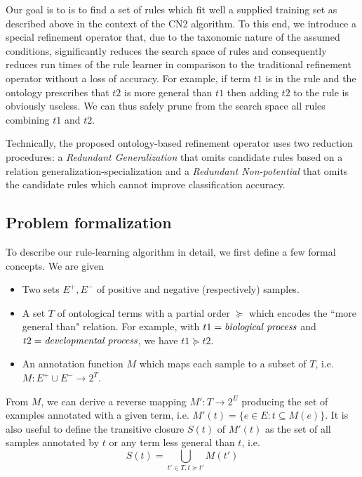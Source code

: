 \documentclass{bmcart}
\begin{document}
Our goal is to is to find a set of rules which fit well a supplied training set as described above in the context of the CN2 algorithm. To this end, we introduce a special refinement operator that, due to the taxonomic nature of the assumed conditions, significantly reduces the search space of rules and consequently reduces run times of the rule learner in comparison to the traditional refinement operator without a loss of accuracy. For example, if term $t1$ is in the rule and the ontology prescribes that $t2$ is more general than $t1$ then adding $t2$ to the rule is obviously useless. We can thus safely prune from the search space all rules combining $t1$ and $t2$.

Technically, the proposed ontology-based refinement operator uses two reduction procedures: a \emph{Redundant Generalization} that omits candidate rules based on a relation generalization-specialization and a \emph{Redundant Non-potential} that omits the candidate rules which cannot improve classification accuracy.

\subsection*{Problem formalization}\label{section:problemdef}
To describe our rule-learning algorithm in detail, we first define a few formal concepts. We are given
\begin{itemize}
	\item Two sets $E^+, E^-$ of positive and negative (respectively) samples.
	\item A set $T$ of ontological terms with a partial order $\succeq$ which encodes the ``more general than" relation. For example, with $t1 = \emph{biological process}$ and $t2 = \emph{developmental process}$, we have $t1 \succeq t2$.
	\item An annotation function $M$ which maps each sample to a subset of $T$, i.e. $M: E^+ \cup E^- \rightarrow 2^T$.
\end{itemize}

From $M$, we can derive a reverse mapping $M': T \rightarrow 2^E$ producing the set of examples annotated with a given term, i.e. $M'(t) = \{e \in E : t \subseteq M(e)\}$. It is also useful to define the transitive closure $S(t)$ of $M'(t)$ as the set of all samples annotated by $t$ or any term less general than $t$, i.e.
\begin{equation}
	S(t) = \bigcup_{t' \in T, t \succeq t'} M(t') 
\end{equation}
\end{document}
